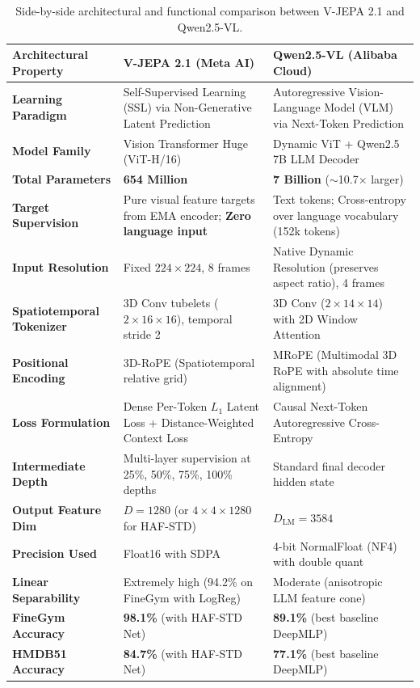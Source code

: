 \documentclass[a4paper, 11pt]{article}
\begin{document}
\begin{table}[H]
\centering
\small
\renewcommand{\arraystretch}{1.25}
\begin{tabularx}{\textwidth}{p{3.4cm} p{5.8cm} p{5.8cm}}
\toprule
\textbf{Architectural Property} & \textbf{V-JEPA 2.1 (Meta AI)} & \textbf{Qwen2.5-VL (Alibaba Cloud)} \\
\midrule
\textbf{Learning Paradigm} & Self-Supervised Learning (SSL) via Non-Generative Latent Prediction & Autoregressive Vision-Language Model (VLM) via Next-Token Prediction \\
\textbf{Model Family} & Vision Transformer Huge (ViT-H/16) & Dynamic ViT + Qwen2.5 7B LLM Decoder \\
\textbf{Total Parameters} & \textbf{654 Million} & \textbf{7 Billion} ($\sim$10.7$\times$ larger) \\
\textbf{Target Supervision} & Pure visual feature targets from EMA encoder; \textbf{Zero language input} & Text tokens; Cross-entropy over language vocabulary (152k tokens) \\
\textbf{Input Resolution} & Fixed $224 \times 224$, 8 frames & Native Dynamic Resolution (preserves aspect ratio), 4 frames \\
\textbf{Spatiotemporal Tokenizer} & 3D Conv tubelets ($2 \times 16 \times 16$), temporal stride 2 & 3D Conv ($2 \times 14 \times 14$) with 2D Window Attention \\
\textbf{Positional Encoding} & 3D-RoPE (Spatiotemporal relative grid) & MRoPE (Multimodal 3D RoPE with absolute time alignment) \\
\textbf{Loss Formulation} & Dense Per-Token $L_1$ Latent Loss + Distance-Weighted Context Loss & Causal Next-Token Autoregressive Cross-Entropy \\
\textbf{Intermediate Depth} & Multi-layer supervision at 25\%, 50\%, 75\%, 100\% depths & Standard final decoder hidden state \\
\textbf{Output Feature Dim} & $D = 1280$ (or $4 \times 4 \times 1280$ for HAF-STD) & $D_{\text{LM}} = 3584$ \\
\textbf{Precision Used} & Float16 with SDPA & 4-bit NormalFloat (NF4) with double quant \\
\textbf{Linear Separability} & Extremely high (94.2\% on FineGym with LogReg) & Moderate (anisotropic LLM feature cone) \\
\textbf{FineGym Accuracy} & \textbf{98.1\%} (with HAF-STD Net) & \textbf{89.1\%} (best baseline DeepMLP) \\
\textbf{HMDB51 Accuracy} & \textbf{84.7\%} (with HAF-STD Net) & \textbf{77.1\%} (best baseline DeepMLP) \\
\bottomrule
\end{tabularx}
\caption{Side-by-side architectural and functional comparison between V-JEPA 2.1 and Qwen2.5-VL.}
\label{tab:comparison_matrix}
\end{table}
\end{document}
